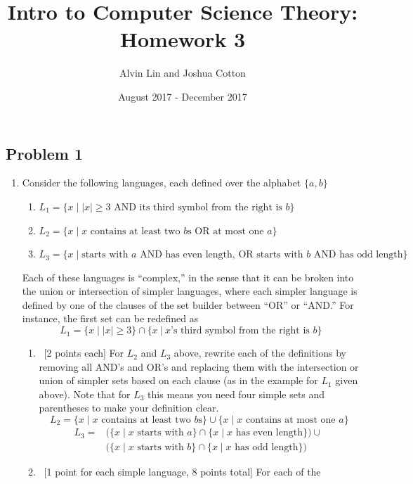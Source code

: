 \documentclass{math}
\title{Intro to Computer Science Theory: Homework 3}
\author{Alvin Lin and Joshua Cotton}
\date{August 2017 - December 2017}
\begin{document}
\maketitle

\subsection*{Problem 1}

\begin{enumerate}
  \item Consider the following languages, each defined over the alphabet
  \( \{a,b\} \)
  \begin{enumerate}
    \item \( L_1 = \{x\mid|x|\geq3\text{ AND its third symbol from the right
    is } b\} \)
    \item \( L_2 = \{x\mid x\text{ contains at least two } b\text{s OR at most
    one } a\} \)
    \item \( L_3=\{x\mid\text{starts with }a\text{ AND has even length, OR
    starts with } b \text{ AND has odd length}\} \)
  \end{enumerate}
  Each of these languages is ``complex,'' in the sense that it can be broken
  into the union or intersection of simpler languages, where each simpler
  language is defined by one of the clauses of the set builder between ``OR''
  or ``AND.'' For instance, the first set can be redefined as
  \[ L_1 = \{x\mid|x|\geq 3\} \cap \{x~|~x\mbox{'s third symbol from the right
    is } b\} \]
  \begin{enumerate}
    \item ~[2 points each] For \( L_2 \) and \( L_3 \) above, rewrite each of
    the definitions by removing all AND's and OR's and replacing them with the
    intersection or union of simpler sets based on each clause (as in the
    example for \( L_1 \) given above). Note that for \( L_3 \) this means you
    need four simple sets and parentheses to make your definition clear.
    \[ L_2 = \{x\mid x\text{ contains at least two } b\text{s}\} \cup \{x\mid
      x\text{ contains at most one } a\} \]
    \begin{align*}
      L_3 =& \bigg(\{x\mid x\text{ starts with } a\}\cap\{x\mid x\text{ has even
        length}\}\bigg)\cup\ \\
      & \bigg(\{x\mid x\text{ starts with } b\}\cap
        \{x\mid x\text{ has odd length}\}\bigg)
    \end{align*}
    \item ~[1 point for each simple language, 8 points total] For each of the

\end{enumerate}
\end{enumerate}
\end{document}
